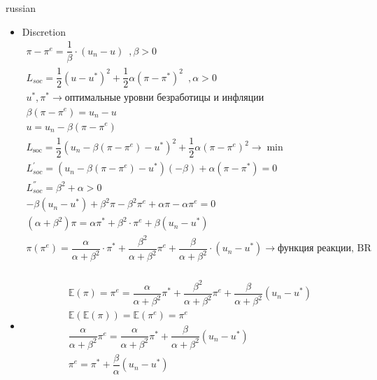 \documentclass{article}
\begin{document}
\begin{otherlanguage*}{russian}
\begin{itemize}
\item Discretion
\begin{align*}
\pi - \pi^e = \dfrac{1}{\beta} \cdot ( u_n - u) \,\,\, , \beta > 0 \\
L_{soc} = \dfrac{1}{2} (u - u^*)^2 + \dfrac{1}{2} \alpha (\pi - \pi^* ) ^  2 \,\,\, , \alpha > 0 \\
u^*, \pi ^* \rightarrow \text{оптимальные уровни безработицы и инфляции}  \\
\beta ( \pi - \pi^e ) = u_n - u \\
u = u_n - \beta ( \pi - \pi^ e) \\
 L_{\text{soc}} = \dfrac{1}{2} (u_n - \beta (\pi - \pi^e) - u^* ) ^ 2 + \dfrac{1}{2} \alpha (\pi - \pi^e) ^ 2 \rightarrow \min \\
L_{soc}^{'} = (u_n - \beta (\pi - \pi^e ) - u^* ) (- \beta) + \alpha ( \pi - \pi ^* ) = 0 \\
L_{soc}^{''} = \beta ^ 2 + \alpha > 0  \\
- \beta (u_n - u^*) + \beta ^ 2 \pi - \beta ^ 2 \pi^e + \alpha \pi - \alpha \pi^e = 0 \\
( \alpha + \beta^ 2) \pi = \alpha \pi^* + \beta ^ 2 \cdot \pi^e + \beta (u_n - u^*) \\
\pi (\pi^e) = \dfrac{\alpha}{\alpha + \beta^2} \cdot \pi^* + \dfrac{\beta^2}{\alpha + \beta^2} \pi^e + \dfrac{\beta}{\alpha + \beta^2} \cdot (u_n - u^* ) \rightarrow \text{функция реакции, BR} \\
\end{align*}
\item 
\begin{align*}
\mathbb{E} (\pi) = \pi^e = \dfrac{\alpha}{\alpha + \beta^2} \pi^* + \dfrac{\beta^2 }{\alpha + \beta^2} \pi^e + \dfrac{\beta}{\alpha + \beta^2} (u_n - u^*) \\
\mathbb{E} (\mathbb{E} (\pi)) = \mathbb{E} (\pi^e) = \pi^e \\
\dfrac{\alpha}{\alpha + \beta^2} \pi^e = \dfrac{\alpha }{\alpha + \beta^2} \pi^* + \dfrac{\beta}{\alpha + \beta^2} (u_n - u^*) \\
\pi^e  = \pi^* + \dfrac{\beta}{\alpha} (u_n - u^* ) 
\end{align*}
\end{itemize}
\end{otherlanguage*} 
\end{document}
